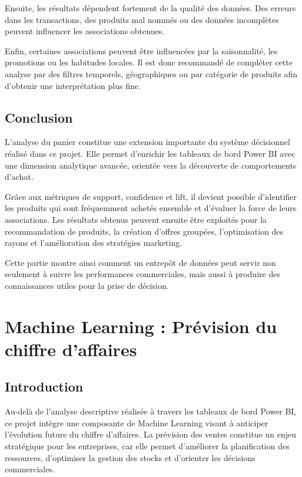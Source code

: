\documentclass[12pt,a4paper,twoside]{report}
\begin{document}
Ensuite, les résultats dépendent fortement de la qualité des données. Des erreurs dans les transactions, des produits mal nommés ou des données incomplètes peuvent influencer les associations obtenues.

Enfin, certaines associations peuvent être influencées par la saisonnalité, les promotions ou les habitudes locales. Il est donc recommandé de compléter cette analyse par des filtres temporels, géographiques ou par catégorie de produits afin d'obtenir une interprétation plus fine.

\section{Conclusion}

L'analyse du panier constitue une extension importante du système décisionnel réalisé dans ce projet. Elle permet d'enrichir les tableaux de bord Power BI avec une dimension analytique avancée, orientée vers la découverte de comportements d'achat.

Grâce aux métriques de support, confidence et lift, il devient possible d'identifier les produits qui sont fréquemment achetés ensemble et d'évaluer la force de leurs associations. Les résultats obtenus peuvent ensuite être exploités pour la recommandation de produits, la création d'offres groupées, l'optimisation des rayons et l'amélioration des stratégies marketing.

Cette partie montre ainsi comment un entrepôt de données peut servir non seulement à suivre les performances commerciales, mais aussi à produire des connaissances utiles pour la prise de décision.

\chapter{Machine Learning : Prévision du chiffre d'affaires}

\section{Introduction}

Au-delà de l'analyse descriptive réalisée à travers les tableaux de bord Power BI, ce projet intègre une composante de Machine Learning visant à anticiper l'évolution future du chiffre d'affaires. La prévision des ventes constitue un enjeu stratégique pour les entreprises, car elle permet d'améliorer la planification des ressources, d'optimiser la gestion des stocks et d'orienter les décisions commerciales.
\end{document}
